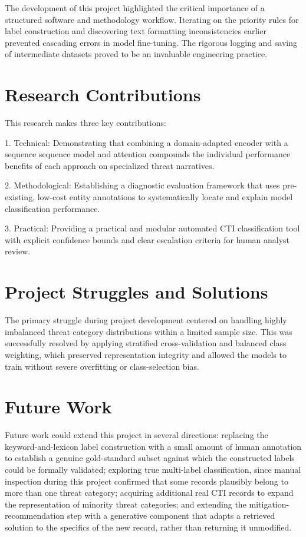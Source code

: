 \documentclass[12pt,a4paper]{report}
\begin{document}
The development of this project highlighted the critical importance of a
structured software and methodology workflow. Iterating on the priority
rules for label construction and discovering text formatting
inconsistencies earlier prevented cascading errors in model fine-tuning.
The rigorous logging and saving of intermediate datasets proved to be an
invaluable engineering practice.
\section{Research
Contributions}

This research makes three key contributions:

1. Technical: Demonstrating that combining a domain-adapted encoder with
a sequence sequence model and attention compounds the individual
performance benefits of each approach on specialized threat narratives.

2. Methodological: Establishing a diagnostic evaluation framework that
uses pre-existing, low-cost entity annotations to systematically locate
and explain model classification performance.

3. Practical: Providing a practical and modular automated CTI
classification tool with explicit confidence bounds and clear escalation
criteria for human analyst review.
\section{Project
Struggles and Solutions}

The primary struggle during project development centered on handling
highly imbalanced threat category distributions within a limited sample
size. This was successfully resolved by applying stratified
cross-validation and balanced class weighting, which preserved
representation integrity and allowed the models to train without severe
overfitting or class-selection bias.
\section{Future Work}

Future work could extend this project in several directions: replacing
the keyword-and-lexicon label construction with a small amount of human
annotation to establish a genuine gold-standard subset against which the
constructed labels could be formally validated; exploring true
multi-label classification, since manual inspection during this project
confirmed that some records plausibly belong to more than one threat
category; acquiring additional real CTI records to expand the
representation of minority threat categories; and extending the
mitigation-recommendation step with a generative component that adapts a
retrieved solution to the specifics of the new record, rather than
returning it unmodified.
\end{document}
